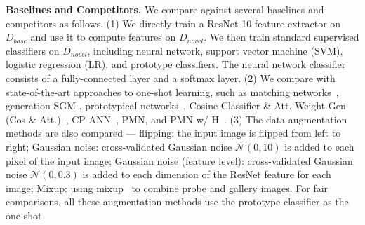 \documentclass[10pt,letterpaper,twocolumn]{article}
\begin{document}
\noindent \textbf{Baselines and Competitors.} We compare against several
baselines and competitors as follows. (1) We directly train a ResNet-10
feature extractor on $D_{base}$ and use it to compute  features
on $D_{novel}$. We then train standard supervised classifiers on
$D_{novel}$, including neural network, support vector machine
(SVM), logistic regression (LR), and prototype classifiers. The neural
network classifier consists of a fully-connected layer and a softmax
 layer. (2) We compare with state-of-the-art approaches
to one-shot learning, such as matching networks~\cite{matchingnet_1shot},
generation SGM \cite{2017ICCVaug}, prototypical networks~\cite{prototype_network},
Cosine Classifier \& Att. Weight Gen (Cos \& Att.)~\cite{dym}, CP-ANN~\cite{cogan},
PMN, and PMN w/ H~\cite{imaginaryData}. (3) The data augmentation
methods are also compared --- flipping: the input image is
flipped from left to right; Gaussian noise: cross-validated
Gaussian noise $\mathcal{N}\left(0,10\right)$ is added to each pixel
of the input image; Gaussian noise (feature level): cross-validated
Gaussian noise $\mathcal{N}\left(0,0.3\right)$ is added to each dimension
of the ResNet feature for each image; Mixup: using mixup~\cite{mixup} to combine probe and gallery images. For fair comparisons, all these
augmentation methods use the prototype classifier as the one-shot
\end{document}
